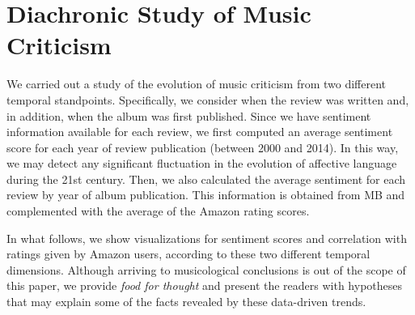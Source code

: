 \section{Diachronic Study of Music Criticism}\label{sec:evolution}

We carried out a study of the evolution of music criticism from two different temporal standpoints. Specifically, we consider when the review was written and, in addition, when the album was first published. Since we have sentiment information available for each review, we first computed an average sentiment score for each year of review publication (between 2000 and 2014). In this way, we may detect any significant fluctuation in the evolution of affective language during the 21st century. Then, we also calculated the average sentiment for each review by year of album publication. This information is obtained from MB and complemented with the average of the Amazon rating scores.

In what follows, we show visualizations for sentiment scores and correlation with ratings given by Amazon users, according to these two different temporal dimensions. Although arriving to musicological conclusions is out of the scope of this paper, we provide \textit{food for thought} and present the readers with hypotheses that may explain some of the facts revealed by these data-driven trends.


